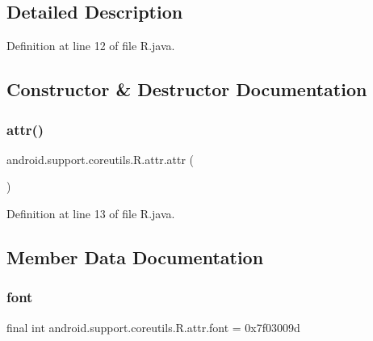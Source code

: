 \subsection{Detailed Description}


Definition at line 12 of file R.\+java.



\subsection{Constructor \& Destructor Documentation}
\mbox{\label{classandroid_1_1support_1_1coreutils_1_1_r_1_1attr_a450a5815fd001f8205ca8028dbff5b23}} 
\subsubsection{\texorpdfstring{attr()}{attr()}}
{\footnotesize\ttfamily android.\+support.\+coreutils.\+R.\+attr.\+attr (\begin{DoxyParamCaption}{ }\end{DoxyParamCaption})\hspace{0.3cm}{\ttfamily [private]}}



Definition at line 13 of file R.\+java.


\begin{DoxyCode}{0}

\end{DoxyCode}


\subsection{Member Data Documentation}
\mbox{\label{classandroid_1_1support_1_1coreutils_1_1_r_1_1attr_a4c489a82e7e8fd81bb99423b6b0f8770}} 
\subsubsection{\texorpdfstring{font}{font}}
{\footnotesize\ttfamily final int android.\+support.\+coreutils.\+R.\+attr.\+font = 0x7f03009d\hspace{0.3cm}{\ttfamily [static]}}



